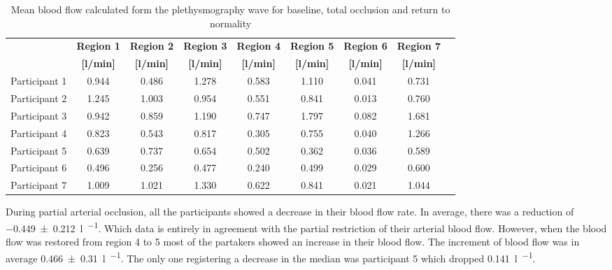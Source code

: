 \begin{table}[!htbp]
	\caption{Mean blood flow calculated form the plethysmography wave for baseline, total occlusion and return to normality}
	\label{tbl:DU_flow}
	\centering \small
	\begin{tabular}{lcccccccc}
		\toprule
		& \textbf{Region 1}
		& \textbf{Region 2}
		& \textbf{Region 3}
		& \textbf{Region 4}
		& \textbf{Region 5}
		& \textbf{Region 6}
		& \textbf{Region 7} \\
		& \textbf{[\si[per-mode=symbol]{\litre\per\minute}]}
		& \textbf{[\si[per-mode=symbol]{\litre\per\minute}]}
		& \textbf{[\si[per-mode=symbol]{\litre\per\minute}]}
		& \textbf{[\si[per-mode=symbol]{\litre\per\minute}]}
		& \textbf{[\si[per-mode=symbol]{\litre\per\minute}]}
		& \textbf{[\si[per-mode=symbol]{\litre\per\minute}]}
		& \textbf{[\si[per-mode=symbol]{\litre\per\minute}]} \\\midrule
		Participant 1    &     0.944     &     0.486     &     1.278     &     0.583     &     1.110     &     0.041     &     0.731     \\  
		Participant 2    &     1.245     &     1.003     &     0.954     &     0.551     &     0.841     &     0.013     &     0.760     \\  
		Participant 3    &     0.942     &     0.859     &     1.190     &     0.747     &     1.797     &     0.082     &     1.681     \\  
		Participant 4    &     0.823     &     0.543     &     0.817     &     0.305     &     0.755     &     0.040     &     1.266     \\  
		Participant 5    &     0.639     &     0.737     &     0.654     &     0.502     &     0.362     &     0.036     &     0.589     \\  
		Participant 6    &     0.496     &     0.256     &     0.477     &     0.240     &     0.499     &     0.029     &     0.600     \\  
		Participant 7    &     1.009     &     1.021     &     1.330     &     0.622     &     0.841     &     0.021     &     1.044     \\  
		\bottomrule
	\end{tabular}
\end{table}

During partial arterial occlusion, all the participants showed a decrease in their blood flow rate. In average, there was a reduction of \SI{-0.449(0212)}{\litre\per\min}. Which data is entirely in agreement with the partial restriction of their arterial blood flow. However, when the blood flow was restored from region 4 to 5 most of the partakers showed an increase in their blood flow. The increment of blood flow was in average \SI{0.466(0310)}{\litre\per\min}. The only one registering a decrease in the median was participant 5 which dropped \SI{0.141}{\litre\per\min}. 

